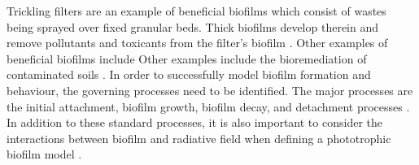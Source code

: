 Trickling filters are an example of beneficial biofilms which consist of wastes being sprayed over fixed granular beds. Thick biofilms develop therein and remove pollutants and toxicants from the filter's biofilm \cite{donlan2002}. Other examples of beneficial biofilms include 
Other examples include the bioremediation of contaminated soils \cite{singh2006}. 
\skippingparagraph
In order to successfully model biofilm formation and behaviour, the governing processes need to be identified. The major processes are the initial attachment, biofilm growth, biofilm decay, and detachment processes \cite{alpkvist2007}. 
In addition to these standard processes, it is also important to consider the interactions between biofilm and radiative field when defining a phototrophic biofilm model \cite{polizzi2017}. 






